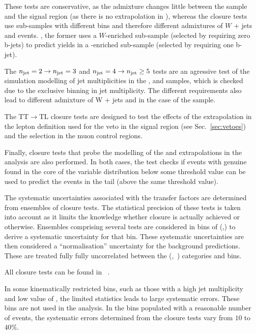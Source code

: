 These tests are conservative, as the admixture changes little between the \mj sample and the signal region 
(as there is no extrapolation in \nb), whereas the closure tests use sub-samples with different \nb bins and
therefore different admixtures of $W$ + jets and \ttbar events. \eg, the former uses a $W$-enriched sub-sample (selected by requiring zero
b-jets) to predict yields in a \ttbar-enriched sub-sample (selected by requiring one b-jet).

The $n_{\text{jet}}=2\rightarrow n_{\text{jet}}=3$ and $n_{\text{jet}}=4\rightarrow n_{\text{jet}}\geq5$ tests are an agressive test of the simulation modelling of jet
multiplicities in the \mj, \mmj and \gj samples, which is checked due to the exclusive binning in jet multiplicity. The different \njet
requirements also lead to different admixture of W + jets and \ttbar in the case of the \mj sample.

The TT$\rightarrow$TL closure tests are designed to test the effects of the extrapolation in the
 lepton definition used for the veto in the signal region (see Sec.~\ref{sec:vetoes}) and the selection in the
muon control regions. 

Finally, closure tests that probe the modelling of the \alphat and \bdphi extrapolations in the analysis are also performed. 
In both cases, the test checks if events with genuine \met found in the core of the variable distribution below some 
threshold value can be used to predict the events in the tail (above the same threshold value). 


The systematic uncertainties associated with the transfer factors are determined from ensembles of closure
tests. The statistical precision of these tests is taken into account as it limits the knowledge whether closure is actually achieved or otherwise. 
Ensembles comprising several tests are considered in bins of (\njet,\scalht) to derive a systematic uncertainty for that bin. These systematic uncertainties are then considered a ``normalisation'' uncertainty for the background predictions. These are treated fully fully uncorrelated between the (\njet,~\nb)
categories and \scalht bins. 

All closure tests can be found in ~\cite{alphaTnote}.


In some kinematically restricted bins, such as those with a high jet multiplicity and low value of \scalht, the
limited statistics leads to large systematic errors. These bins are not used in the analysis. 
In the bins populated with a reasonable number of events, the systematic errors determined from the closure tests vary from $10$ to
$40\%$.



